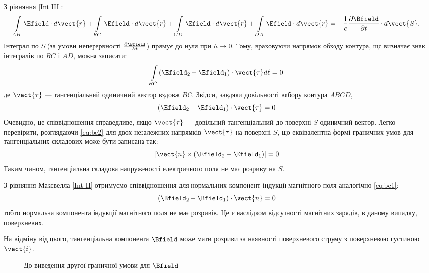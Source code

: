 З рівняння \eqref{Int III}:
\begin{equation*}
    \int\limits_{AB} \Efield\cdot d\vect{r} + \int\limits_{BC} \Efield\cdot d\vect{r} + \int\limits_{CD} \Efield\cdot d\vect{r} + \int\limits_{DA}
    \Efield\cdot d\vect{r} =
    -\frac1c \frac{\partial\Bfield}{\partial t}\cdot d\vect{S}.
\end{equation*}
Інтеграл по $S$ (за умови неперервності $\frac{\partial\Bfield}{\partial t}$) прямує до нуля при $h\to0$.
Тому, враховуючи напрямок обходу контура, що визначає знак інтегралів по
$BC$ і $AD$, можна записати:
\begin{equation*}
\int\limits_{BC} (\Efield_2 - \Efield_1)\cdot\vect{\tau} d\ell = 0
\end{equation*}
де $\vect{\tau}$ --- тангенціальний одиничний вектор вздовж $BC$. Звідси, завдяки
довільності вибору контура $ABCD$,
\begin{equation}\label{eq:bc2}
    (\Efield_2 - \Efield_1)\cdot\vect{\tau} = 0
\end{equation}
Очевидно, це співвідношення справедливе, якщо $\vect{\tau}$ --- довільний тангенціальний до поверхні $S$ одиничний вектор.
Легко перевірити, розглядаючи \eqref{eq:bc2} для двох незалежних напрямків $\vect{\tau}$ на
поверхні $S$, що еквівалентна формі граничних умов для тангенціальних
складових може бути записана так:
\begin{equation*}
    \left[ \vect{n}\times (\Efield_2 - \Efield_1)\right] = 0
\end{equation*}
Таким чином, тангенціальна складова напруженості електричного поля не
має розривy на $S$.

З рівняння Максвелла \eqref{Int II} отримуємо співвідношення для нормальних
компонент індукції магнітного поля аналогічно \eqref{eq:bc1}:
\begin{equation}
     (\Bfield_2 - \Bfield_1)\cdot\vect{n} = 0
\end{equation}
тобто нормальна компонента індукції магнітного поля не має розривів. Це є
наслідком відсутності магнітних зарядів, в даному випадку, поверхневих.

На відміну від цього, тангенціальна компонента $\Bfield$ може
мати розриви за наявності поверхневого струму з поверхневою густиною~$\vect{i}$.

\begin{SCfigure}[0.5][h!]
	\centering
	\caption{До виведення другої граничної умови для $\Bfield$}%
	\label{tikz:bc2m}
\end{SCfigure}

